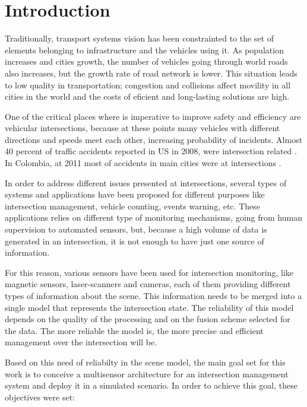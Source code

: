 \chapter*{Introduction}
%

Traditionally, transport systems vision has been constrainted to the set of elements belonging to infrastructure and the vehicles using it. As population increases and cities growth, the number of vehicles going through world roads also increases, but the growth rate of road network is lower. This situation leads to low quality in transportation; congestion and collisions affect movility in all cities in the world and the costs of eficient and long-lasting solutions are high.

One of the critical places where is imperative to improve safety and efficiency are vehicular intersections, because at these points many vehicles with different directions and speeds meet each other, increasing probability of incidents. Almost 40 percent of traffic accidents reported in US in 2008, were intersection related \cite{Choi2010}. In Colombia, at 2011 most of accidents in main cities were at intersections \cite{CorporacionFondodePrevencionVial2010}.

In order to address different issues presented at intersections, several types of systems and applications have been proposed for different purposes like intersection management, vehicle counting, events warning, etc. These applications relies on different type of monitoring mechanisms, going from human supervision to automated sensors, but, because a high volume of data is generated in an intersection, it is not enough to have just one source of information.

For this reason, various sensors have been used for intersection monitoring, like magnetic sensors, laser-scanners and cameras, each of them providing different types of information about the scene. This information needs to be merged into a single model that represents the intersection state. The reliability of this model depends on the quality of the processing and on the fusion scheme selected for the data. The more reliable the model is, the more precise and efficient management over the intersection will be.

Based on this need of reliabilty in the scene model, the main goal set for this work is to conceive a multisensor architecture for an intersection management system and deploy it in a simulated scenario. In order to achieve this goal, these objectives were set:

